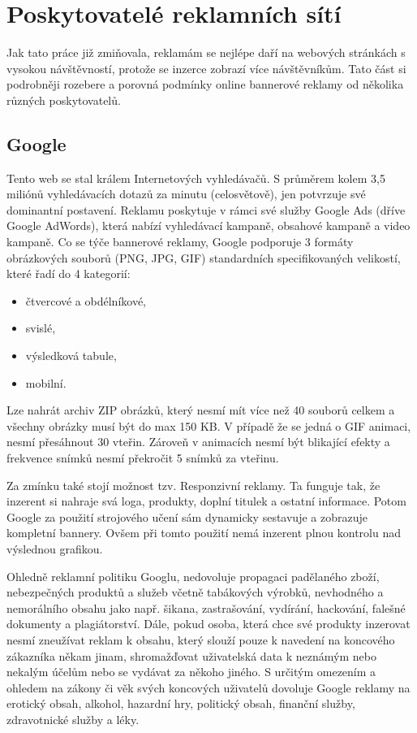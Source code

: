 \section{Poskytovatelé reklamních sítí}
\label{sec:networks}
Jak tato práce již zmiňovala, reklamám se nejlépe daří na webových stránkách s vysokou návštěvností, protože se inzerce zobrazí více návštěvníkům.
Tato část si podrobněji rozebere a porovná podmínky online bannerové reklamy od několika různých poskytovatelů. 

    \subsection{Google}
    Tento web se stal králem Internetových vyhledávačů. S průměrem kolem 3,5 miliónů vyhledávacích dotazů za minutu (celosvětově),
    jen potvrzuje své dominantní postavení. Reklamu poskytuje v rámci své služby Google Ads (dříve Google AdWords),
    která nabízí vyhledávací kampaně, obsahové kampaně a video kampaně. Co se týče bannerové reklamy,
    Google podporuje 3 formáty obrázkových souborů (PNG, JPG, GIF) standardních specifikovaných velikostí, které řadí do 4 kategorií:
    \begin{itemize}
        \item čtvercové a obdélníkové,
        \item svislé,
        \item výsledková tabule,
        \item mobilní.
    \end{itemize}

    Lze nahrát archiv ZIP obrázků, který nesmí mít více než 40 souborů celkem a všechny obrázky musí být do max 150 KB. V případě že se jedná o GIF animaci,
    nesmí přesáhnout 30 vteřin. Zároveň v animacích nesmí být blikající efekty a frekvence snímků nesmí překročit 5 snímků za vteřinu.

    Za zmínku také stojí možnost tzv. Responzivní reklamy. Ta funguje tak, že inzerent si nahraje svá loga, produkty,
    doplní titulek a ostatní informace. Potom Google za použití strojového učení sám dynamicky sestavuje a zobrazuje kompletní bannery.
    Ovšem při tomto použití nemá inzerent plnou kontrolu nad výslednou grafikou.

    Ohledně reklamní politiku Googlu, nedovoluje propagaci padělaného zboží, nebezpečných produktů a služeb včetně tabákových výrobků,
    nevhodného a nemorálního obsahu jako např. šikana, zastrašování, vydírání, hackování, falešné dokumenty a plagiátorství. Dále, pokud osoba,
    která chce své produkty inzerovat nesmí zneužívat reklam k obsahu, který slouží pouze k navedení na koncového zákazníka někam jinam,
    shromažďovat uživatelská data k neznámým nebo nekalým účelům nebo se vydávat za někoho jiného. S určitým omezením a ohledem na zákony či věk svých koncových
    uživatelů dovoluje Google reklamy na erotický obsah, alkohol, hazardní hry, politický obsah, finanční služby, zdravotnické služby a léky.

